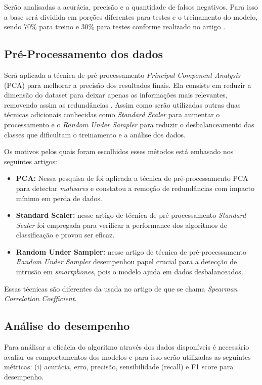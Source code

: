\documentclass[12pt]{article}
\begin{document}
Serão analisadas a acurácia, 
precisão e a quantidade de falsos negativos. 
Para isso a base será dividida em porções
diferentes para testes e o treinamento do modelo,
sendo 70\% para treino e 30\% para testes
conforme realizado no artigo \cite{Aissou2021}. 

\subsection{Pré-Processamento dos dados}

Será aplicada a técnica de pré processamento
\textit{Principal Component Analysis} (PCA) para melhorar
a precisão dos resultados finais. Ela consiste em reduzir a
dimensão do dataset para deixar apenas as informações mais relevantes,
removendo assim as redundâncias \cite{IBM02025}. Assim como serão utilizadas
outras duas técnicas adicionais conhecidas como \textit{Standard Scaler} para
aumentar o processamento e o
\textit{Random Under Sampler} para reduzir o desbalanceamento das classes
que dificultam o treinamento e a análise dos dados.

Os motivos pelos quais foram escolhidos esses métodos está embasado nos seguintes artigos: 
\begin{itemize}
  \item \textbf{PCA:} Nessa pesquisa de \textcite {Zhang2019MachineLW} 
    foi aplicada a técnica de pré-processamento PCA para detectar \textit{malwares}
    e constatou a remoção de redundâncias com impacto mínimo em perda de dados.
  \item \textbf{Standard Scaler:} nesse artigo de \textcite {DEAMORIM2023109924} 
    técnica de pré-processamento \textit{Standard Scaler} foi empregada para verificar 
    a performance dos algoritmos de classificação e provou ser eficaz.
  \item \textbf{Random Under Sampler:} nesse artigo de \textcite {DEAMORIM2023109924} 
    técnica de pré-processamento \textit{Random Under Sampler} desempenhou papel crucial
    para a detecção de intrusão em \textit{smartphones}, pois o modelo ajuda em dados desbalanceados.
\end{itemize}

Essas técnicas são
diferentes da usada no artigo de \cite{Aissou2021}
que se chama \textit{Spearman Correlation Coefficient}.


\subsection{Análise do desempenho}
Para análisar a eficácia do algoritmo através dos dados disponíveis é 
necessário avaliar os comportamentos dos modelos e para isso 
serão utilizadas as seguintes métricas: (i) acurácia, erro, precisão, 
sensibilidade (recall) e F1 score para desempenho.
\end{document}
